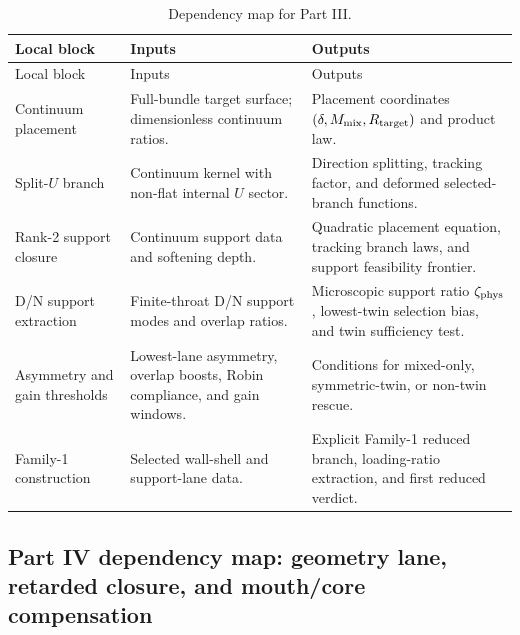 \begin{longtable}{L{0.18\textwidth}L{0.29\textwidth}L{0.35\textwidth}}
\caption{Dependency map for Part III.}\label{tab:dep-part-iii}\\
\toprule
Local block & Inputs & Outputs \\
\midrule
\endfirsthead
\toprule
Local block & Inputs & Outputs \\
\midrule
\endhead
Continuum placement & Full-bundle target surface; dimensionless continuum ratios. & Placement coordinates \((\delta,M_{\rm mix},R_{\rm target})\) and product law. \\
\addlinespace
Split-\(U\) branch & Continuum kernel with non-flat internal \(U\) sector. & Direction splitting, tracking factor, and deformed selected-branch functions. \\
\addlinespace
Rank-2 support closure & Continuum support data and softening depth. & Quadratic placement equation, tracking branch laws, and support feasibility frontier. \\
\addlinespace
D/N support extraction & Finite-throat D/N support modes and overlap ratios. & Microscopic support ratio \(\zeta_{\rm phys}\), lowest-twin selection bias, and twin sufficiency test. \\
\addlinespace
Asymmetry and gain thresholds & Lowest-lane asymmetry, overlap boosts, Robin compliance, and gain windows. & Conditions for mixed-only, symmetric-twin, or non-twin rescue. \\
\addlinespace
Family-1 construction & Selected wall-shell and support-lane data. & Explicit Family-1 reduced branch, loading-ratio extraction, and first reduced verdict. \\
\bottomrule
\end{longtable}

\subsection{Part IV dependency map: geometry lane, retarded closure, and mouth/core compensation}
\label{subsec:dep-part-iv}


